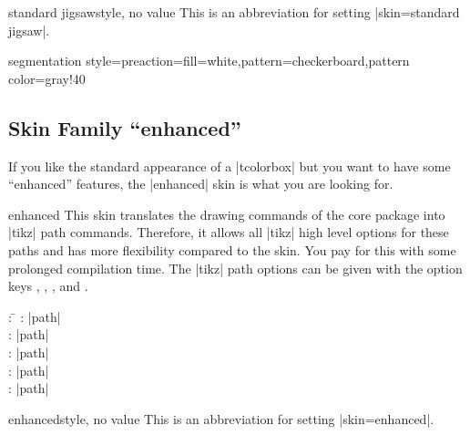 \begin{docTcbKey}{standard jigsaw}{}{style, no value}
  This is an abbreviation for setting |skin=standard jigsaw|.
\end{docTcbKey}

\begin{dispExample*}{segmentation style={preaction={fill=white},pattern=checkerboard,pattern color=gray!40}}
\end{dispExample*}


\clearpage
\subsection{Skin Family \enquote{enhanced}}
\begin{marker}
If you like the standard appearance of a |tcolorbox| but you want to
have some \enquote{enhanced} features, the |enhanced| skin is what you are looking for.
\end{marker}

\begin{docSkin}{enhanced}
  This skin translates the drawing commands of the core package into |tikz|
  path commands. Therefore, it allows all |tikz| high level options for
  these paths and has more flexibility compared to the  skin.
  You pay for this with some prolonged compilation time.
  The |tikz| path options can
  be given with the option keys
  ,
  ,
  , and
  .
\begin{tcolorbox}[skintable=enhanced]
  \begin{tabbing}
    : \=\kill
    :           \> |path|\\
    : \> |path|\\ 
    :        \> |path|\\
    :    \> |path|\\
    :           \> |path|
  \end{tabbing}
\end{tcolorbox}
\end{docSkin}


\begin{docTcbKey}{enhanced}{}{style, no value}
  This is an abbreviation for setting |skin=enhanced|.
\end{docTcbKey}

